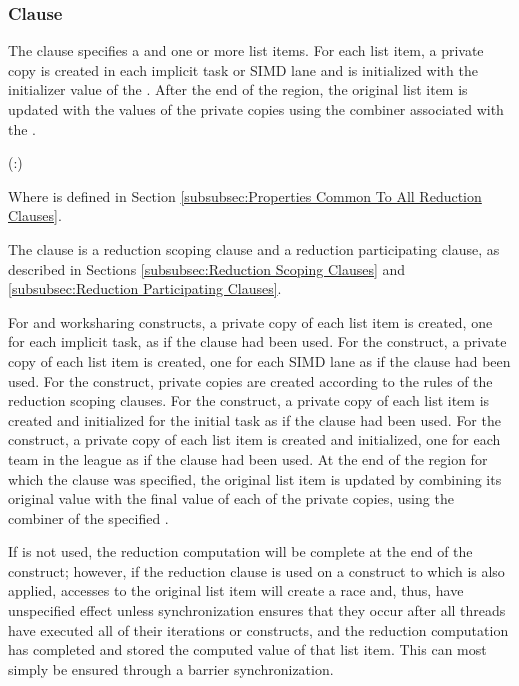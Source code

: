 {{{{\subsubsection{ Clause}
\label{subsubsec:reduction clause}
\summary
The  clause specifies a  and one or
more list items. For each list item, a private copy is created in each implicit
task or SIMD lane and is initialized with the initializer value of the
. After the end of the region, the original list item
is updated with the values of the private copies using the combiner associated
with the .

\syntax
\begin{boxedcode}
(:)
\end{boxedcode}
Where  is defined in Section
\ref{subsubsec:Properties Common To All Reduction Clauses}.

\descr
The  clause is a reduction scoping clause and a reduction
participating clause, as described in Sections \ref{subsubsec:Reduction Scoping
Clauses} and \ref{subsubsec:Reduction Participating Clauses}.

For  and worksharing constructs, a private copy of each list item is created, 
one for each implicit task, as if the  clause had been used. For the  
construct, a private copy of each list item is created, one for each SIMD lane as if the 
 clause had been used. 
For the  construct, private copies are created according to the rules of the reduction scoping clauses. 
For the  construct, a private
copy of each list item is created and initialized for the initial task as if
the  clause had been used. For the  construct, a
private copy of each list item is created and initialized, one for each team in
the league as if the  clause had been used. At the end of the
region for  which the  clause was specified, the original list
item is updated by combining its original value with the final value of each of
the private copies, using the combiner of the specified
.


If  is not used, the reduction computation will be complete at the end of the 
construct; however, if the reduction clause is used on a construct to which  is 
also applied, accesses to the original list item will create a race and, thus, have 
unspecified effect unless synchronization ensures that they occur after all threads have 
executed all of their iterations or  constructs, and the reduction computation 
has completed and stored the computed value of that list item. This can most simply be 
ensured through a barrier synchronization.


}}}}
